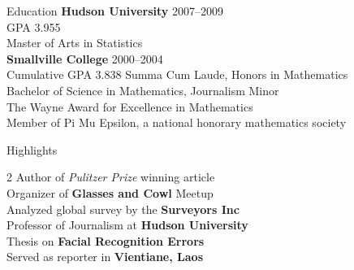 \documentclass{resume}
\begin{document}
\begin{rSection}{Education}
            {\bf Hudson University} \hfill {2007--2009} \\
                        GPA 3.955\\
        Master of Arts in Statistics
    \smallskip\\
            {\bf Smallville College} \hfill {2000--2004} \\
                        Cumulative GPA 3.838 Summa Cum Laude, Honors in Mathematics\\
        Bachelor of Science in Mathematics, Journalism Minor\\
        The Wayne Award for Excellence in Mathematics\\
        Member of Pi Mu Epsilon, a national honorary mathematics society
    \end{rSection}

\begin{rSection}{Highlights}
\begin{multicols}{2}
\setlength\multicolsep{0pt}
Author of \emph{Pulitzer Prize} winning article \\
Organizer of \textbf{Glasses and Cowl} Meetup \\
Analyzed global survey by the \textbf{Surveyors Inc} \\
Professor of Journalism at \textbf{Hudson University} \\
Thesis on \textbf{Facial Recognition Errors} \\
Served as reporter in \textbf{Vientiane, Laos}
\end{multicols}
\end{rSection}
\end{document}
